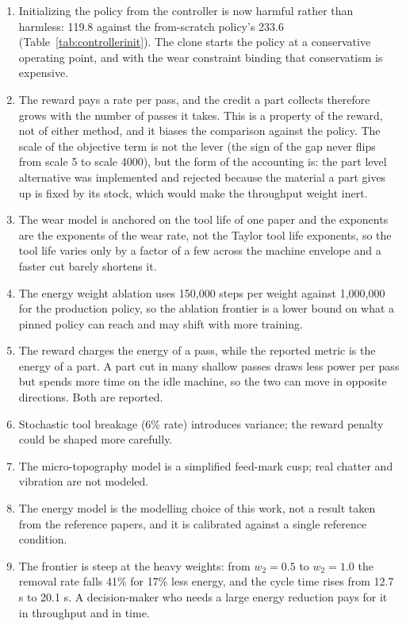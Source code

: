 \documentclass[11pt,a4paper]{article}
\begin{document}
\begin{enumerate}
    \item Initializing the policy from the controller is now harmful rather than harmless: 119.8 against the from-scratch policy's 233.6 (Table~\ref{tab:controllerinit}). The clone starts the policy at a conservative operating point, and with the wear constraint binding that conservatism is expensive.
    \item The reward pays a rate per pass, and the credit a part collects therefore grows with the number of passes it takes. This is a property of the reward, not of either method, and it biases the comparison against the policy. The scale of the objective term is not the lever (the sign of the gap never flips from scale 5 to scale 4000), but the form of the accounting is: the part level alternative was implemented and rejected because the material a part gives up is fixed by its stock, which would make the throughput weight inert.
    \item The wear model is anchored on the tool life of one paper and the exponents are the exponents of the wear rate, not the Taylor tool life exponents, so the tool life varies only by a factor of a few across the machine envelope and a faster cut barely shortens it.
    \item The energy weight ablation uses 150,000 steps per weight against 1,000,000 for the production policy, so the ablation frontier is a lower bound on what a pinned policy can reach and may shift with more training.
    \item The reward charges the energy of a pass, while the reported metric is the energy of a part. A part cut in many shallow passes draws less power per pass but spends more time on the idle machine, so the two can move in opposite directions. Both are reported.
    \item Stochastic tool breakage (6\% rate) introduces variance; the reward penalty could be shaped more carefully.
    \item The micro-topography model is a simplified feed-mark cusp; real chatter and vibration are not modeled.
    \item The energy model is the modelling choice of this work, not a result taken from the reference papers, and it is calibrated against a single reference condition.
    \item The frontier is steep at the heavy weights: from $w_2 = 0.5$ to $w_2 = 1.0$ the removal rate falls 41\% for 17\% less energy, and the cycle time rises from 12.7 s to 20.1 s. A decision-maker who needs a large energy reduction pays for it in throughput and in time.
\end{enumerate}
\end{document}
